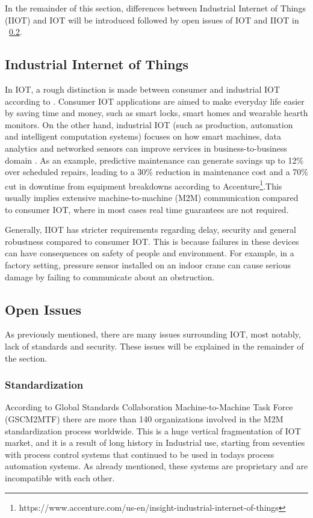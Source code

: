 In the remainder of this section, differences between Industrial Internet of Things (IIOT) and IOT will be introduced followed by open issues of IOT and IIOT  in ~\ref{section:OpenIssues}.


\subsection{Industrial Internet of Things}

In IOT, a rough distinction is made between consumer and industrial IOT according to \cite{Bandyopadhyay2011}. Consumer IOT applications are aimed to make everyday life easier by saving time and money, such as smart locks, smart homes and wearable hearth monitors. On the other hand, industrial IOT (such as production, automation and intelligent computation systems) focuses on how smart machines, data analytics and networked sensors can improve services in business-to-business domain 
\cite{Palattella2016}. As an example, predictive maintenance can generate savings up to 12\% over scheduled repairs, leading to a 30\% reduction in maintenance cost and a 70\% cut in downtime from equipment breakdowns according to Accenture\footnote{https://www.accenture.com/us-en/insight-industrial-internet-of-things}.This usually implies extensive machine-to-machine (M2M) communication compared to consumer IOT, where in most cases real time guarantees are not required.

Generally, IIOT has stricter requirements regarding delay, security and general robustness compared to consumer IOT. This is because failures in these devices can have consequences on safety of people and environment. For example, in a factory setting, pressure sensor installed on an indoor crane can cause serious damage by failing to communicate about an obstruction.

\subsection{Open Issues}
\label{section:OpenIssues}
As previously mentioned, there are many issues surrounding IOT, most notably, lack of standards and security. These issues will be explained in the remainder of the section.

\subsubsection{Standardization}
\label{section:Standardization}

According to Global Standards Collaboration Machine-to-Machine Task Force (GSCM2MTF) there are more than 140 organizations involved in the M2M standardization process worldwide.  
This is a huge vertical fragmentation of IOT market, and it is a result of long history in Industrial use, starting from seventies with process control systems that continued to be used in todays process automation systems. As already mentioned, these systems are proprietary and are incompatible with each other.

